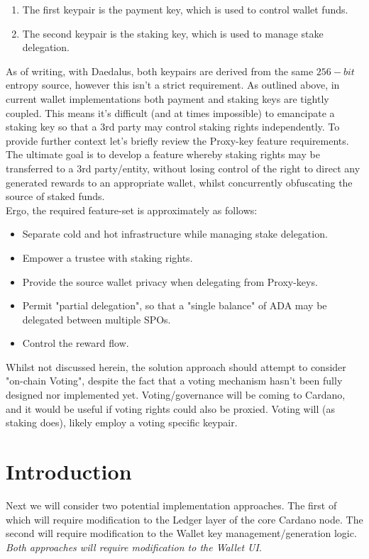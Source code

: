 \documentclass[11pt,a4paper]{article}
\begin{document}
\begin{enumerate}
  \item The first keypair is the payment key, which is used to control wallet funds.
  \item The second keypair is the staking key, which is used to manage stake delegation. 
\end{enumerate}

As of writing, with Daedalus, both keypairs are derived from the same $256-bit$ entropy
source, however this isn't a strict requirement. 
As outlined above, in current wallet implementations both payment and staking keys are tightly 
coupled. This means it's difficult (and at times impossible) to emancipate a staking key so 
that a 3rd party may control staking rights independently. 
To provide further context let's briefly review the Proxy-key feature requirements. \\

The ultimate goal is to develop a feature whereby staking rights may be transferred to a 3rd
party/entity, without losing control of the right to direct any generated rewards to an 
appropriate wallet, whilst concurrently obfuscating the source of staked funds. \\

Ergo, the required feature-set is approximately as follows:

\begin{itemize}
  \item Separate cold and hot infrastructure while managing stake delegation.
  \item Empower a \gls{trustee} with staking rights.
  \item Provide the source wallet privacy when delegating from Proxy-keys.
  \item Permit "partial delegation", so that a "single balance" of ADA may be delegated between multiple SPOs.
  \item Control the reward flow.
\end{itemize}

Whilst not discussed herein, the solution approach should attempt to consider "on-chain Voting",
despite the fact that a voting mechanism hasn't been fully designed nor implemented yet.
Voting/governance will be coming to Cardano, and it would be useful if voting rights could
also be proxied. Voting will (as staking does), likely employ a voting specific keypair.

\pagebreak

\section{Introduction}
Next we will consider two potential implementation approaches. The first of which will require modification 
to the Ledger layer of the core Cardano node. The second will require modification to the Wallet key 
management/generation logic. \emph{Both approaches will require modification to the Wallet UI}.
\end{document}

